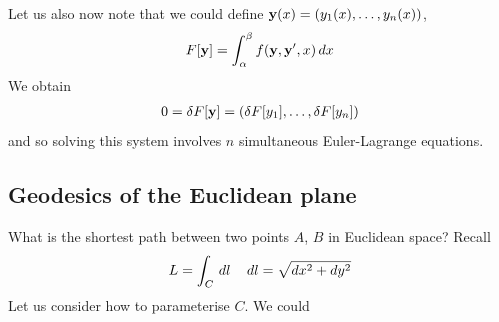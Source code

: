 \documentclass{../template/note}
\begin{document}
    Let us also now note that we could define $\V y(x) = (y_1(x), \dots, y_n(x))$,
    \begin{align*}
        F[\V y] = \int_\alpha^\beta f(\V y, \V y', x) \D x
    \end{align*}
    We obtain
    \begin{align*}
        0 = \delta F[\V y] = (\delta F[y_1], \dots, \delta F[y_n])
    \end{align*}
    and so solving this system involves $n$ simultaneous Euler-Lagrange equations.
    
    \subsection{Geodesics of the Euclidean plane}

    What is the shortest path between two points $A$, $B$ in Euclidean space? Recall
    \begin{align*}
        L = \int_C \,d{l} && \,d{l} = \sqrt{dx^2 + dy^2}
    \end{align*}
    Let us consider how to parameterise $C$. We could
\end{document}
